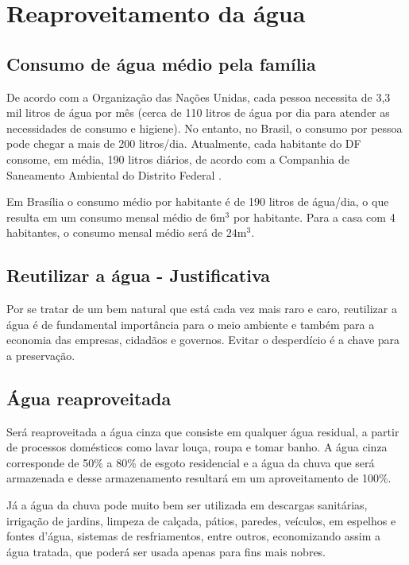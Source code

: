 
\section{Reaproveitamento da água}

\subsection{Consumo de água médio pela família}

	De acordo com a Organização das Nações Unidas, cada pessoa necessita de 3,3 mil litros de água por mês (cerca de 110 litros de água por dia para atender as necessidades de consumo e higiene). No entanto, no Brasil, o consumo por pessoa pode chegar a mais de 200 litros/dia. Atualmente, cada habitante do DF consome, em média, 190 litros diários, de acordo com a Companhia de Saneamento Ambiental do Distrito Federal \cite{CAESB}.

	Em Brasília o consumo médio por habitante é de 190 litros de água/dia, o que resulta em um consumo mensal médio de $6\si{\meter}^3$ por habitante. Para a casa com 4 habitantes, o consumo mensal médio será de $24\si{\meter}^3$.

\subsection{Reutilizar a água - Justificativa}

	Por se tratar de um bem natural que está cada vez mais raro e caro, reutilizar a água é de fundamental importância para o meio ambiente e também para a economia das empresas, cidadãos e governos. Evitar o desperdício é a chave para a preservação.

\subsection{Água reaproveitada}

	Será reaproveitada a água cinza que consiste em qualquer água residual, a partir de processos domésticos como lavar louça, roupa e tomar banho. A água cinza corresponde de 50\% a 80\% de esgoto residencial e a água da chuva que será armazenada e desse armazenamento resultará em um aproveitamento de 100\%.

	Já a água da chuva pode muito bem ser utilizada em descargas sanitárias, irrigação de jardins, limpeza de calçada, pátios, paredes, veículos, em espelhos e fontes d’água, sistemas de resfriamentos, entre outros, economizando assim a água tratada, que poderá ser usada apenas para fins mais nobres.

